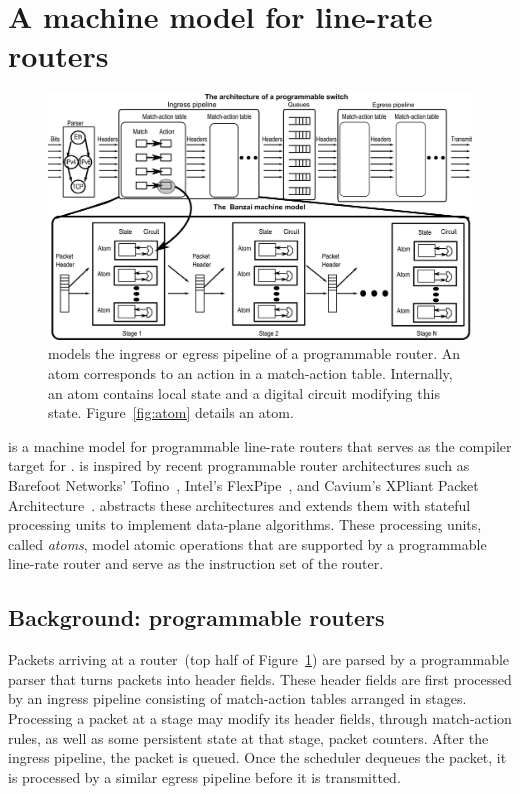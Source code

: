 \section{A machine model for line-rate routers}
\label{s:absmachine}
\begin{figure}[!t]
  \includegraphics[width=\textwidth]{domino_banzai.pdf}
  \caption{\absmachine models the ingress or egress pipeline of a
  programmable router. An atom corresponds to an action in a match-action
  table. Internally, an atom contains local state and a digital circuit 
  modifying this state. Figure~\ref{fig:atom} details an atom.}
  \label{domino_fig:router}
\end{figure}

\absmachine is a machine model for programmable line-rate routers that serves
as the compiler target for \pktlanguage.  \absmachine is inspired by recent
programmable router architectures such as Barefoot Networks'
Tofino~\cite{tofino}, Intel's FlexPipe~\cite{flexpipe}, and Cavium's XPliant
Packet Architecture~\cite{xpliant}. \absmachine abstracts these architectures
and extends them with stateful processing units to implement data-plane
algorithms.  These processing units, called {\em atoms}, model atomic
operations that are supported by a programmable line-rate router and serve as
the instruction set of the router.

\subsection{Background: programmable routers}
Packets arriving at a router~(top half of Figure~\ref{domino_fig:router}) are
parsed by a programmable parser that turns packets into header fields. These
header fields are first processed by an ingress pipeline consisting of
match-action tables arranged in stages. Processing a packet at a stage may
modify its header fields, through match-action rules, as well as some
persistent state at that stage, \eg packet counters. After the ingress
pipeline, the packet is queued. Once the scheduler dequeues the packet, it is
processed by a similar egress pipeline before it is transmitted.

